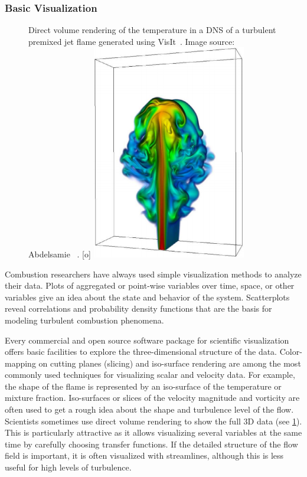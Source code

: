 \subsubsection{Basic Visualization} %
\label{ssub:basic_visualization}
%
\begin{figure}[t]
    \begin{captionbeside}{Direct volume rendering of the temperature in a
        \ac{DNS} of a turbulent premixed jet flame generated using
        VisIt~\cite{HPV:VisIt}. Image source: Abdelsamie
        \etal~\cite{Abdelsamie2016}.
        \label{fig:visit_volrend}}[o]
        \includegraphics[width=0.6\textwidth]{figures/jet_visit.png}
    \end{captionbeside}
\end{figure}
%
Combustion researchers have always used simple visualization methods to analyze
their data.
%
Plots of aggregated or point-wise variables over time, space, or other variables
give an idea about the state and behavior of the system.
%
Scatterplots reveal correlations and probability density functions that are the
basis for modeling turbulent combustion phenomena.
%

%
Every commercial and open source software package for scientific visualization
offers basic facilities to explore the three-dimensional structure of the data.
%
Color-mapping on cutting planes (slicing) and iso-surface rendering are among
the most commonly used techniques for visualizing scalar and velocity data.
%
For example, the shape of the flame is represented by an iso-surface of the
temperature or mixture fraction.
%
Iso-surfaces or slices of the velocity magnitude and vorticity are often used to
get a rough idea about the shape and turbulence level of the flow.
%
Scientists sometimes use direct volume rendering to show the full \ac{3D} data
(see \cref{fig:visit_volrend}).
%
This is particularly attractive as it allows visualizing several variables at
the same time by carefully choosing transfer functions.
%
If the detailed structure of the flow field is important, it is often visualized
with streamlines, although this is less useful for high levels of turbulence.
%

